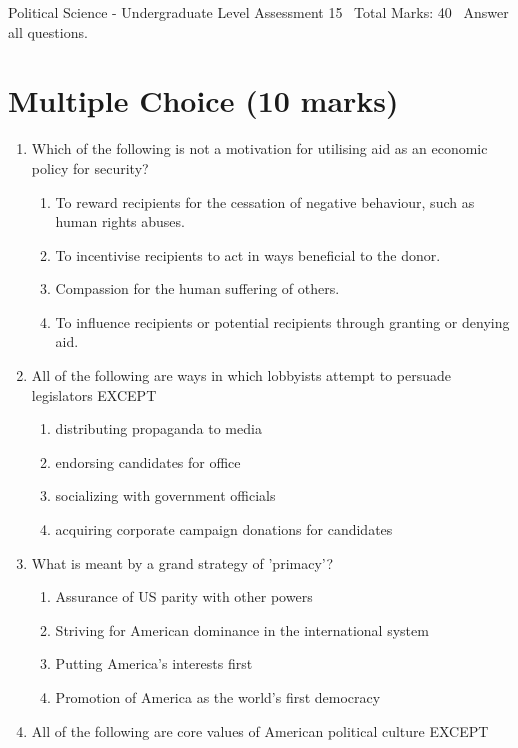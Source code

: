 \documentclass[12pt]{article}
\begin{document}
\begin{center}
Political Science - Undergraduate Level Assessment 15 \
Total Marks: 40 \
Answer all questions.
\end{center}

\section*{Multiple Choice (10 marks)}
\begin{enumerate}[label=\arabic*.]
\item Which of the following is not a motivation for utilising aid as an economic policy for security?
\begin{enumerate}[label=(\alph*)]
    \item To reward recipients for the cessation of negative behaviour, such as human rights abuses.
    \item To incentivise recipients to act in ways beneficial to the donor.
    \item Compassion for the human suffering of others.
    \item To influence recipients or potential recipients through granting or denying aid.
\end{enumerate}
\item All of the following are ways in which lobbyists attempt to persuade legislators EXCEPT
\begin{enumerate}[label=(\alph*)]
    \item distributing propaganda to media
    \item endorsing candidates for office
    \item socializing with government officials
    \item acquiring corporate campaign donations for candidates
\end{enumerate}
\item What is meant by a grand strategy of 'primacy'?
\begin{enumerate}[label=(\alph*)]
    \item Assurance of US parity with other powers
    \item Striving for American dominance in the international system
    \item Putting America's interests first
    \item Promotion of America as the world's first democracy
\end{enumerate}
\item All of the following are core values of American political culture EXCEPT

\end{enumerate}
\end{document}
